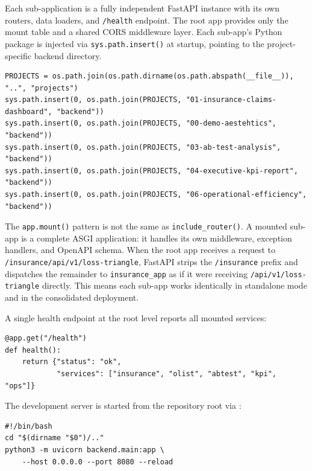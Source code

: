 Each sub-application is a fully independent FastAPI instance with its own routers, data loaders, and \texttt{/health} endpoint. The root app provides only the mount table and a shared CORS middleware layer. Each sub-app's Python package is injected via \texttt{sys.path.insert()} at startup, pointing to the project-specific backend directory.

\begin{lstlisting}[style=python, caption={sys.path manipulation for sub-app discovery (lines 10--15)}]
PROJECTS = os.path.join(os.path.dirname(os.path.abspath(__file__)), "..", "projects")
sys.path.insert(0, os.path.join(PROJECTS, "01-insurance-claims-dashboard", "backend"))
sys.path.insert(0, os.path.join(PROJECTS, "00-demo-aestehtics", "backend"))
sys.path.insert(0, os.path.join(PROJECTS, "03-ab-test-analysis", "backend"))
sys.path.insert(0, os.path.join(PROJECTS, "04-executive-kpi-report", "backend"))
sys.path.insert(0, os.path.join(PROJECTS, "06-operational-efficiency", "backend"))
\end{lstlisting}

\begin{keyinsight}
The \texttt{app.mount()} pattern is not the same as \texttt{include\_router()}. A mounted sub-app is a complete ASGI application: it handles its own middleware, exception handlers, and OpenAPI schema. When the root app receives a request to \texttt{/insurance/api/v1/loss-triangle}, FastAPI strips the \texttt{/insurance} prefix and dispatches the remainder to \texttt{insurance\_app} as if it were receiving \texttt{/api/v1/loss-triangle} directly. This means each sub-app works identically in standalone mode and in the consolidated deployment.
\end{keyinsight}

A single health endpoint at the root level reports all mounted services:

\begin{lstlisting}[style=python, caption={Root health endpoint}]
@app.get("/health")
def health():
    return {"status": "ok",
            "services": ["insurance", "olist", "abtest", "kpi", "ops"]}
\end{lstlisting}

The development server is started from the repository root via :

\begin{lstlisting}[style=yaml, caption={backend/dev.sh}]
#!/bin/bash
cd "$(dirname "$0")/.."
python3 -m uvicorn backend.main:app \
    --host 0.0.0.0 --port 8080 --reload
\end{lstlisting}

